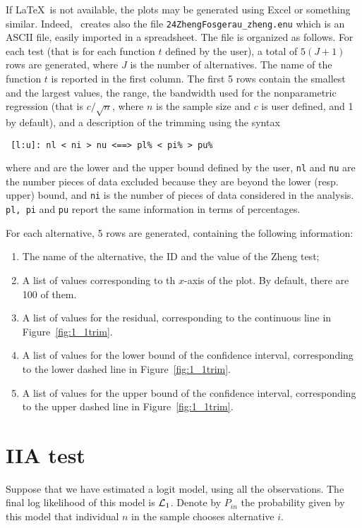 \documentclass[12pt]{memoir}
\begin{document}
If \LaTeX\ is not available,  the plots may be generated using Excel
or something similar. Indeed, \BIOSIM\ creates also the file
\texttt{24ZhengFosgerau\_zheng.enu} which is an ASCII file, easily
imported in a spreadsheet. The file is organized as follows. For each
test (that is for each function $t$ defined by the user), a total of
$5 (J+1)$ rows are generated, where $J$ is the number of
alternatives. The name of the function $t$ is reported in the first
column. The first 5 rows contain the smallest and the largest values,
the range, the bandwidth used for the nonparametric regression (that
is $c/\sqrt{n}$, where $n$ is the sample size and $c$ is user defined,
and 1 by default), and a description of the trimming using the syntax 
{\footnotesize
\begin{verbatim}
 [l:u]: nl < ni > nu <==> pl% < pi% > pu%
\end{verbatim}
}
where  and  are the lower and the upper bound defined
by the user, \texttt{nl} and \texttt{nu} are the number pieces of data excluded
because they are beyond the lower (resp. upper) bound, and \texttt{ni}
is the number of pieces of data considered in the analysis. \texttt{pl,
pi} and \texttt{pu} report the same information in terms of
percentages.  

For each alternative, 5 rows are generated, containing the following information:
\begin{enumerate}
\item The name of the alternative, the ID and the value of the Zheng
test;
\item A list of  values corresponding to th $x$-axis of the plot. By default, there
are 100 of them.
\item A  list of values for the residual, corresponding
to the continuous line in Figure~\ref{fig:1_1trim}.
\item A  list of values for the lower bound of the
confidence interval, corresponding to the lower dashed line in Figure~\ref{fig:1_1trim}.
\item A  list of values for the upper bound of the
confidence interval, corresponding to the upper dashed line in Figure~\ref{fig:1_1trim}.
\end{enumerate}


\section{IIA test}
\label{sec:iia}
Suppose that we have estimated a logit model, using all the observations. The final log likelihood of this model is $\mathcal{L}_1$. Denote by $P_{in}$ the probability given by this model that individual $n$ in the sample chooses alternative $i$.
\end{document}
